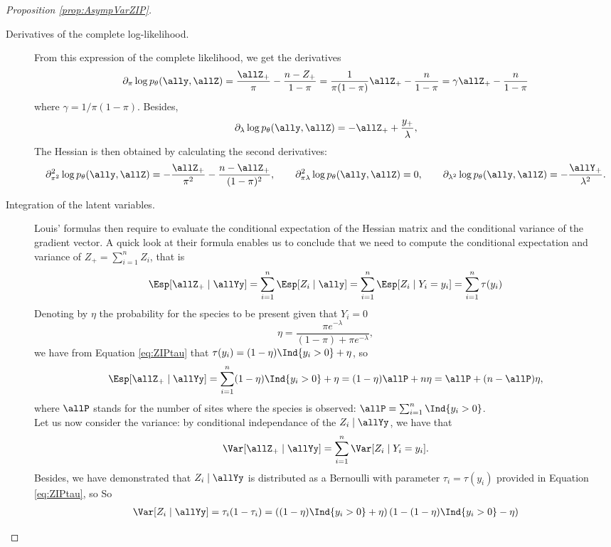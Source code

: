 \begin{proof}[Proposition \ref{prop:AsympVarZIP}]
\begin{description}
  \item[Derivatives of the complete log-likelihood.]
   From this expression of the complete likelihood, we get the derivatives
  $$
  \partial_\pi \log p_\theta(\ally, \allZ) 
  = \frac{\allZ_+}{\pi} - \frac{n- Z_+}{1 - \pi}   =  \frac{1}{\pi(1-\pi)} \allZ_+ - \frac{n}{1 - \pi}\\
  =  \gamma \allZ_+ - \frac{n}{1 - \pi}
  $$
  where $\gamma = 1/\pi(1-\pi)$. 
  Besides, 
  $$
  \partial_\lambda \log p_\theta(\ally, \allZ) = - \allZ_+ + \frac{y_+}{\lambda},
  $$
  The Hessian is then obtained by calculating the second derivatives:
  \begin{equation}\label{eq:HessZIP}
    \partial^2_{\pi^2} \log p_\theta(\ally, \allZ) = - \frac{\allZ_+}{\pi^2} - \frac{n- \allZ_+}{(1 - \pi)^2}, 
    \qquad
    \partial^2_{\pi\lambda} \log p_\theta(\ally, \allZ) = 0, 
    \qquad
    \partial_{\lambda^2} \log p_\theta(\ally, \allZ) = - \frac{\allY_+}{\lambda^2}.
    \end{equation}
  \item[Integration of the latent variables.]
  Louis' formulas then require to evaluate the conditional expectation of the Hessian matrix and the conditional variance of the gradient vector. A quick look at their formula enables us to conclude that we need to compute the conditional expectation and variance of $Z_+ = \sum_{i=1}^n Z_i$, that is
  $$
  \Esp[ \allZ_+ \mid \allYy]  
  = \sum_{i=1}^n \Esp[ Z_i \mid   \ally]= \sum_{i=1}^n \Esp[ Z_i \mid   Y_i=y_i] = \sum_{i=1}^n \tau(y_i)
  $$
  Denoting by $\eta$ the probability for the species to be present given that $Y_i=0$
  $$
  \eta = \frac{\pi e^{-\lambda}}{(1-\pi) + \pi e^{-\lambda}},
  $$
  we have from Equation \eqref{eq:ZIPtau} that $\tau(y_i) = (1-\eta) \Ind{y_i > 0} + \eta$, so
  $$
  \Esp[ \allZ_+ \mid \allYy]  
  = \sum_{i=1}^n  (1-\eta) \Ind{y_i > 0} +  \eta =  (1-\eta) \allP  + n \eta
  = \allP + (n - \allP) \eta,
  $$
  where $\allP$ stands for the number of sites where the species is observed: $\allP = \sum_{i=1}^n \Ind{y_i > 0}$. \\
  Let us now consider the variance: by conditional independance of the $Z_i \mid \allYy$, we have that
  $$
  \Var[ \allZ_+ \mid \allYy]  = \sum_{i=1}^n \Var[ Z_i \mid   Y_i=y_i].
  $$ 
  Besides, we have demonstrated that $Z_i \mid \allYy$ is distributed as a Bernoulli with parameter $\tau_i = \tau(y_i)$ provided in Equation \eqref{eq:ZIPtau}, so 
  So 
  \begin{align*}
  \Var[ Z_i \mid \allYy] 
  &=  \tau_i (1- \tau_i)=  \left((1-\eta)\Ind{y_i>0} +\eta\right)(1-(1-\eta)\Ind{y_i>0} -\eta)\\

\end{align*}
\end{description}
\end{proof}
